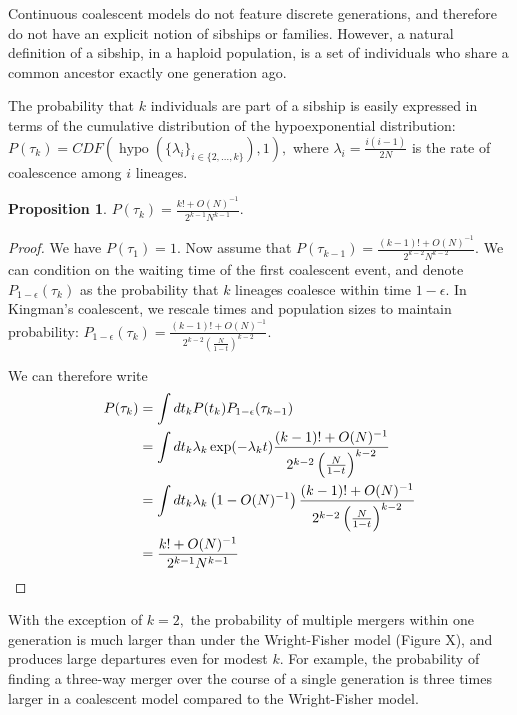 \documentclass[review,nonatbib]{elsarticle}
\newcommand{\hypo}{\operatorname{hypo}}
\newtheorem{proposition}{Proposition}
\begin{document}
Continuous coalescent models do not feature discrete generations, and therefore do not have an explicit notion of sibships or families. 
However, a natural definition of a sibship, in a haploid population, is a set of individuals who share a common ancestor exactly one generation ago.

The probability that $k$ individuals are part of a sibship is easily expressed in terms of the 
cumulative distribution of the hypoexponential distribution: $P(\tau_k) = CDF(\hypo(\{\lambda_i\}_{i\in\{2,\ldots,k\}}),1),$ where $\lambda_i=\frac{i (i-1)}{2N}$ is 
the rate of coalescence among $i$ lineages. 

\begin{proposition}
 $P(\tau_k) =  \frac{ k! +O(N)^{-1}}{2^{k-1}N^{k-1}}.$ 
 \end{proposition}

\begin{proof}
We have $P(\tau_1)=1$. Now assume that $P(\tau_{k-1}) =  \frac{ (k-1)! +O(N)^{-1}}{2^{k-2}N^{k-2}}.$ We can condition
on the waiting time of the first coalescent event, and denote $P_{1-\epsilon}(\tau_k)$ as the probability that $k$ lineages coalesce within time 
$1-\epsilon.$ In Kingman's coalescent, we rescale times and population sizes to maintain probability:
 $P_{1-\epsilon}(\tau_k) =  \frac{ (k-1)! +O(N)^{-1}}{2^{k-2}\left(\frac{N}{1-t}\right)^{k-2}}.$ 

We can therefore write
\begin{equation}
\begin{split}
P(\tau_k) &= \int dt_k P(t_k) P_{1-\epsilon}(\tau_{k-1}) \\
&= \int dt_k \lambda_k \exp(-\lambda_k t)  \frac{ (k-1)! +O(N)^{-1}}{2^{k-2}\left(\frac{N}{1-t}\right)^{k-2}}  \\ 
&= \int dt_k \lambda_k\left(1-O(N)^{-1}\right)  \frac{ (k-1)! +O(N)^{-1}}{2^{k-2}\left(\frac{N}{1-t}\right)^{k-2}}  \\
&= \frac{ k! +O(N)^{-1}}{2^{k-1}N^{k-1}} \qedhere
\end{split}
\end{equation}
 \end{proof}
 
    

With the exception of $k=2,$ the probability of multiple mergers within one generation is much larger than under the Wright-Fisher model (Figure X), and produces large departures even for modest $k$. 
For example,  the probability of finding a three-way merger over the course of a single generation is three times larger in a coalescent model compared to the 
Wright-Fisher model. 
\end{document}
